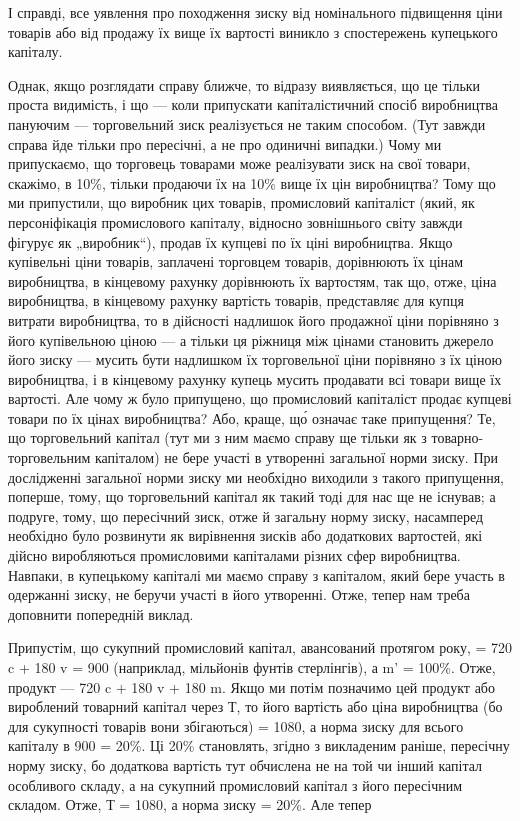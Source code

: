 \parcont{}  %
І справді, все уявлення про походження зиску від номінального
підвищення ціни товарів або від продажу їх вище їх вартості
виникло з спостережень купецького капіталу.

Однак, якщо розглядати справу ближче, то відразу виявляється,
що це тільки проста видимість, і що — коли припускати
капіталістичний спосіб виробництва пануючим — торговельний
зиск реалізується не таким способом. (Тут завжди справа
йде тільки про пересічні, а не про одиничні випадки.) Чому
ми припускаємо, що торговець товарами може реалізувати зиск
на свої товари, скажімо, в 10\%, тільки продаючи їх на 10\%
вище їх цін виробництва? Тому що ми припустили, що виробник
цих товарів, промисловий капіталіст (який, як персоніфікація
промислового капіталу, відносно зовнішнього світу завжди
фігурує як „виробник“), продав їх купцеві по їх ціні виробництва.
Якщо купівельні ціни товарів, заплачені торговцем товарів, дорівнюють
їх цінам виробництва, в кінцевому рахунку дорівнюють
їх вартостям, так що, отже, ціна виробництва, в кінцевому рахунку
вартість товарів, представляє для купця витрати виробництва, то
в дійсності надлишок його продажної ціни порівняно з його купівельною
ціною — а тільки ця ріжниця між цінами становить джерело
його зиску — мусить бути надлишком їх торговельної ціни
порівняно з їх ціною виробництва, і в кінцевому рахунку купець
мусить продавати всі товари вище їх вартості. Але чому ж було
припущено, що промисловий капіталіст продає купцеві товари по
їх цінах виробництва? Або, краще, що́ означає таке припущення?
Те, що торговельний капітал (тут ми з ним маємо справу
ще тільки як з товарно-торговельним капіталом) не бере участі
в утворенні загальної норми зиску. При дослідженні загальної
норми зиску ми необхідно виходили з такого припущення, поперше,
тому, що торговельний капітал як такий тоді для нас
ще не існував; а подруге, тому, що пересічний зиск, отже й загальну
норму зиску, насамперед необхідно було розвинути як
вирівнення зисків або додаткових вартостей, які дійсно виробляються
промисловими капіталами різних сфер виробництва.
Навпаки, в купецькому капіталі ми маємо справу з капіталом,
який бере участь в одержанні зиску, не беручи участі в його
утворенні. Отже, тепер нам треба доповнити попередній виклад.

Припустім, що сукупний промисловий капітал, авансований
протягом року, = 720 c + 180 v = 900 (наприклад, мільйонів фунтів
стерлінгів), а m' = 100\%. Отже, продукт — 720 c + 180 v + 180 m.
Якщо ми потім позначимо цей продукт або вироблений товарний
капітал через Т, то його вартість або ціна виробництва
(бо для сукупності товарів вони збігаються) = 1080, а норма
зиску для всього капіталу в 900 = 20\%. Ці 20\% становлять,
згідно з викладеним раніше, пересічну норму зиску, бо додаткова
вартість тут обчислена не на той чи інший капітал особливого
складу, а на сукупний промисловий капітал з його пересічним
складом. Отже, Т = 1080, а норма зиску = 20\%. Але тепер
\parbreak{}  %

